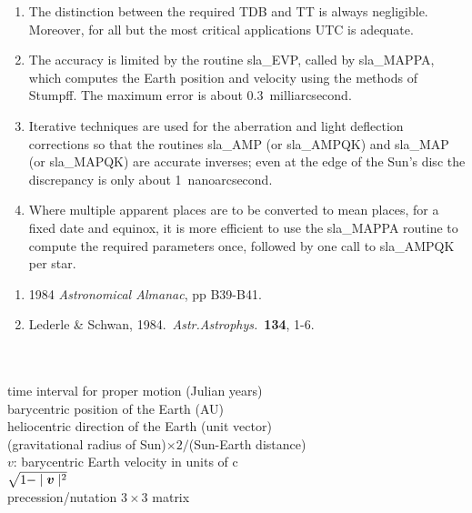 {
 \begin{enumerate}
  \item The distinction between the required TDB and TT is
        always negligible.  Moreover, for all but the most
        critical applications UTC is adequate.
  \item The accuracy is limited by the routine sla\_EVP, called
        by sla\_MAPPA, which computes the Earth position and
        velocity using the methods of Stumpff.  The maximum
        error is about 0.3~milliarcsecond.
  \item Iterative techniques are used for the aberration and
        light deflection corrections so that the routines
        sla\_AMP (or sla\_AMPQK) and sla\_MAP (or sla\_MAPQK) are
        accurate inverses;  even at the edge of the Sun's disc
        the discrepancy is only about 1~nanoarcsecond.
  \item Where multiple apparent places are to be converted to
        mean places, for a fixed date and equinox, it is more
        efficient to use the sla\_MAPPA routine to compute the
        required parameters once, followed by one call to
        sla\_AMPQK per star.
 \end{enumerate}
}
{
 \begin{enumerate}
  \item 1984 {\it Astronomical Almanac}, pp B39-B41.
  \item Lederle \& Schwan, 1984.\ {\it Astr.Astrophys.}\ {\bf 134}, 1-6.
 \end{enumerate}
}
{
}
{
  \\
  \\
      {time interval for proper motion (Julian years)} \\
    {barycentric position of the Earth (AU)} \\
    {heliocentric direction of the Earth (unit vector)} \\
      {(gravitational radius of
                      Sun)$\times 2 / $(Sun-Earth distance)} \\
   {\mbox{\boldmath $v$}: barycentric Earth
                                               velocity in units of c} \\
     {$\sqrt{1-\mid\mbox{\boldmath $v$}\mid^2}$} \\
  {precession/nutation $3\times3$ matrix}
}
